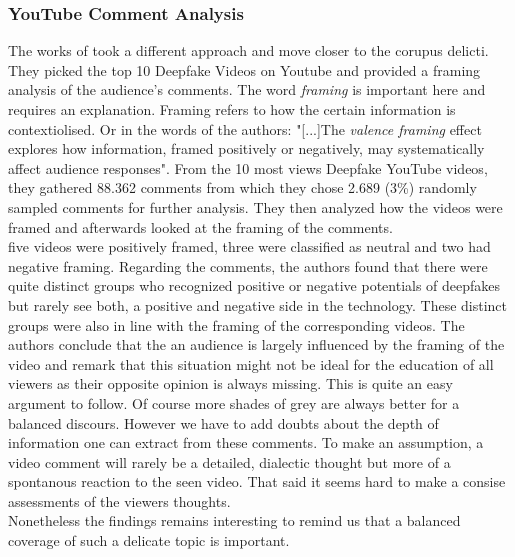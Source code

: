 \documentclass[
  a4paper,  %
  twoside,  %
  bibliography=totoc,
  headsepline,
  cleardoublepage=empty,
  parskip=half,
  draft=false
]{scrbook}
\begin{document}
\subsubsection*{YouTube Comment Analysis}
The works of \citeauthor{leeBelieveNotBelieve2021} took a different approach and move closer to the corupus delicti. They picked the top 10 Deepfake Videos on Youtube and provided a framing analysis of the audience's comments. The word \textit{framing} is important here and requires an explanation. Framing refers to how the certain information is contextiolised. Or in the words of the authors: "[...]The \textit{valence framing} effect explores how information, framed positively or negatively, may systematically affect audience responses". From the 10 most views Deepfake YouTube videos, they gathered 88.362 comments from which they chose 2.689 (3\%) randomly sampled comments for further analysis. They then analyzed how the videos were framed and afterwards looked at the framing of the comments.\\
five videos were positively framed, three were classified as neutral and two had negative framing. Regarding the comments, the authors found that there were quite distinct groups who recognized positive or negative potentials of deepfakes but rarely see both, a positive and negative side in the technology. These distinct groups were also in line with the framing of the corresponding videos. The authors conclude that the an audience is largely influenced by the framing of the video and remark that this situation might not be ideal for the education of all viewers as their opposite opinion is always missing. This is quite an easy argument to follow. Of course more shades of grey are always better for a balanced discours. However we have to add doubts about the depth of information one can extract from these comments. To make an assumption, a video comment will rarely be a detailed, dialectic thought but more of a spontanous reaction to the seen video. That said it seems hard to make a consise assessments of the viewers thoughts. \\
Nonetheless the findings remains interesting to remind us that a balanced coverage of such a delicate topic is important.
\end{document}

